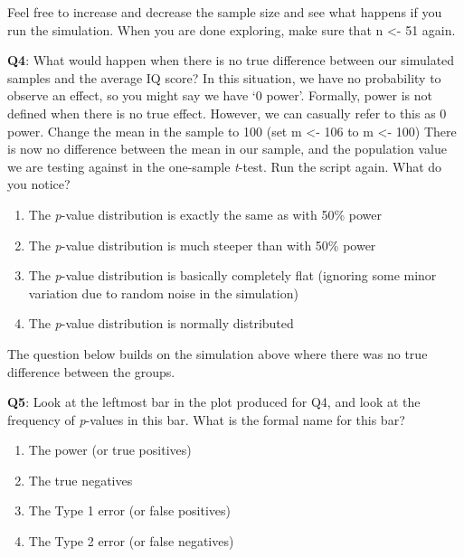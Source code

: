 \documentclass[
  oneside]{book}
\providecommand{\tightlist}{%
  \setlength{\itemsep}{0pt}\setlength{\parskip}{0pt}}
\begin{document}
Feel free to increase and decrease the sample size and see what happens if you run the simulation. When you are done exploring, make sure that n \textless- 51 again.

\textbf{Q4}: What would happen when there is no true difference between our simulated samples and the average IQ score? In this situation, we have no probability to observe an effect, so you might say we have `0 power'. Formally, power is not defined when there is no true effect. However, we can casually refer to this as 0 power. Change the mean in the sample to 100 (set m \textless- 106 to m \textless- 100) There is now no difference between the mean in our sample, and the population value we are testing against in the one-sample \emph{t}-test. Run the script again. What do you notice?

\begin{enumerate}
\def\labelenumi{\Alph{enumi})}
\tightlist
\item
  The \emph{p}-value distribution is exactly the same as with 50\% power
\item
  The \emph{p}-value distribution is much steeper than with 50\% power
\item
  The \emph{p}-value distribution is basically completely flat (ignoring some minor variation due to random noise in the simulation)
\item
  The \emph{p}-value distribution is normally distributed
\end{enumerate}

The question below builds on the simulation above where there was no true difference between the groups.

\textbf{Q5}: Look at the leftmost bar in the plot produced for Q4, and look at the frequency of \emph{p}-values in this bar. What is the formal name for this bar?

\begin{enumerate}
\def\labelenumi{\Alph{enumi})}
\tightlist
\item
  The power (or true positives)
\item
  The true negatives
\item
  The Type 1 error (or false positives)
\item
  The Type 2 error (or false negatives)
\end{enumerate}
\end{document}
